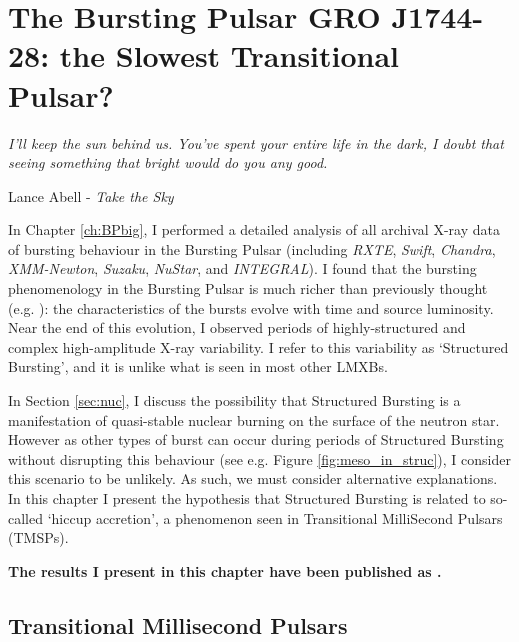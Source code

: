 \chapter{The Bursting Pulsar GRO J1744-28: the Slowest Transitional Pulsar?}

\label{ch:BPletter}

\epigraph{\textit{I'll keep the sun behind us.  You've spent your entire life in the dark, I doubt that seeing something that bright would do you any good.}}{Lance Abell - \textit{Take the Sky}}
\vspace{1cm}

\par\noindent In Chapter \ref{ch:BPbig}, I performed a detailed analysis of all archival X-ray data of bursting behaviour in the Bursting Pulsar (including \textit{RXTE}\indexrxte, \indexswift\textit{Swift}, \indexchandra\textit{Chandra}, \indexxmm\textit{XMM-Newton}, \indexsuzaku\textit{Suzaku}, \indexnustar\textit{NuStar}, and \indexintegral\textit{INTEGRAL}).  I found that the bursting phenomenology in the Bursting Pulsar is much richer than previously thought (e.g. \citealp{Giles_BP}): the characteristics of the bursts evolve with time and source luminosity. Near the end of this evolution, I observed periods of highly-structured and complex high-amplitude X-ray variability.  I refer to this variability as `Structured Bursting', and it is unlike what is seen in most other LMXBs.
\par In Section \ref{sec:nuc}, I discuss the possibility that Structured Bursting is a manifestation of quasi-stable nuclear burning on the surface of the neutron star.  However as other types of burst can occur during periods of Structured Bursting without disrupting this behaviour (see e.g. Figure \ref{fig:meso_in_struc}), I consider this scenario to be unlikely.  As such, we must consider alternative explanations.  In this chapter I present the hypothesis that Structured Bursting is related to so-called `hiccup accretion', a phenomenon seen in Transitional MilliSecond Pulsars (TMSPs).
\par \textbf{The results I present in this chapter have been published as \citet{BPletter}.}

\section{Transitional Millisecond Pulsars}

